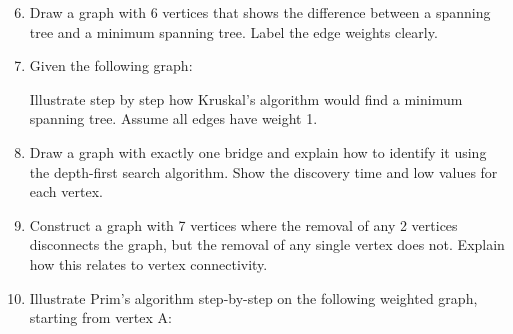 \documentclass{article}
\theoremstyle{definition}
\begin{document}
\begin{enumerate}\setcounter{enumi}{5}
\item Draw a graph with 6 vertices that shows the difference between a spanning tree and a minimum spanning tree. Label the edge weights clearly.

\item Given the following graph:
\begin{center}
\end{center}
Illustrate step by step how Kruskal's algorithm would find a minimum spanning tree. Assume all edges have weight 1.

\item Draw a graph with exactly one bridge and explain how to identify it using the depth-first search algorithm. Show the discovery time and low values for each vertex.

\item Construct a graph with 7 vertices where the removal of any 2 vertices disconnects the graph, but the removal of any single vertex does not. Explain how this relates to vertex connectivity.

\item Illustrate Prim's algorithm step-by-step on the following weighted graph, starting from vertex A:
\begin{center}
\end{center}
\end{enumerate}
\end{document}
